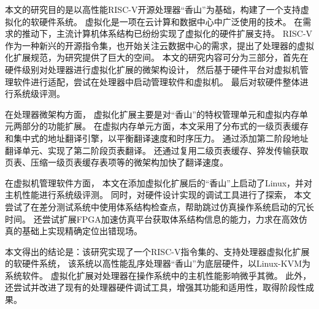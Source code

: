 \begin{cabstract}
本文的研究目的是以高性能RISC-V开源处理器“香山”为基础，构建了一个支持虚拟化的软硬件系统。
虚拟化是一项在云计算和数据中心中广泛使用的技术。
在需求的推动下，主流计算机体系结构已纷纷实现了虚拟化的硬件扩展支持。
RISC-V作为一种新兴的开源指令集，也开始关注云数据中心的需求，提出了处理器的虚拟化扩展规范，为研究提供了巨大的空间。
本文的研究内容可分为三部分，首先在硬件级别对处理器进行虚拟化扩展的微架构设计，
然后基于硬件平台对虚拟机管理软件进行适配，尝试在处理器中启动管理软件和虚拟机。
最后对软硬件整体进行系统级评测。

在处理器微架构方面，
虚拟化扩展主要是对“香山”的特权管理单元和虚拟内存单元两部分的功能扩展。
在虚拟内存单元方面，本文采用了分布式的一级页表缓存和集中式的地址翻译引擎，以平衡翻译速度和时序压力。
通过添加第二阶段地址翻译单元、实现了第二阶段页表翻译。
还通过复用二级页表缓存、猝发传输获取页表、压缩一级页表缓存表项等的微架构加快了翻译速度。

在虚拟机管理软件方面，
本文在添加虚拟化扩展后的“香山”上启动了Linux，并对主机性能进行系统级评测。
同时，对硬件设计实现的调试工具进行了探索，
本文尝试了在差分测试系统中使用体系结构检查点，帮助跳过仿真操作系统启动的冗长时间。
还尝试扩展FPGA加速仿真平台获取体系结构信息的能力，力求在高效仿真的基础上实现精确定位出错现场。

本文得出的结论是：该研究实现了一个RISC-V指令集的、支持处理器虚拟化扩展的软硬件系统，
该系统以高性能乱序处理器“香山”为底层硬件，以Linux-KVM为系统软件。
虚拟化扩展对处理器在操作系统中的主机性能影响微乎其微。
此外，还尝试并改进了现有的处理器硬件调试工具，增强其功能和适用性，取得阶段性成果。

\end{cabstract}

